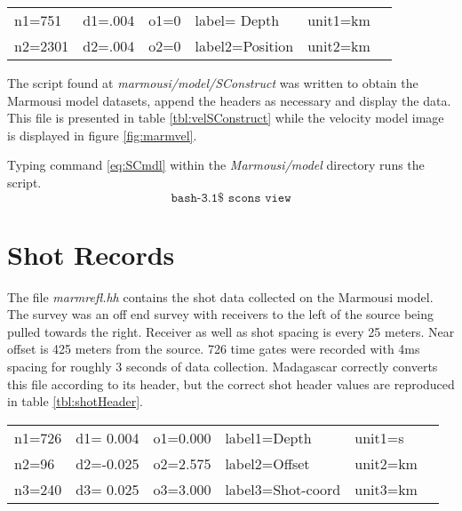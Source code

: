{
\begin{tabular}{|llllll|}
        \hline        
    n1=751    &     d1=.004   &        o1=0  &        label= Depth     & unit1=km &  \\ 
    n2=2301   &     d2=.004   &        o2=0  &        label2=Position  & unit2=km &  \\
	\hline
\end{tabular}
}

The script found at \emph{marmousi/model/SConstruct} was written to obtain the Marmousi model datasets, append the headers as necessary and display the  data.  This file is presented in table \ref{tbl:velSConstruct} while the velocity model image is displayed in figure \ref{fig:marmvel}.
 
{
\tiny

\normalsize
}


Typing command \ref{eq:SCmdl} within the \emph{Marmousi\slash model} directory runs the script.
\begin{equation}\label{eq:SCmdl} \texttt{bash-3.1\$\ scons\ view} \end{equation}


\section{Shot Records}
The file \emph{marmrefl.hh} contains the shot data collected on the Marmousi model.  The survey was an off end survey with receivers to the left of the source being pulled towards the right.  Receiver as well as shot spacing is every 25 meters.  Near offset is 425 meters from the source.  726 time gates were recorded with 4ms spacing for roughly 3 seconds of data collection.  Madagascar correctly converts this file according to its header, but the correct shot header values are reproduced in table \ref{tbl:shotHeader}.   

{
	\begin{tabular}{|llllll|}
	\hline  
	    n1=726 &  d1= 0.004   &  o1=0.000  &  label1=Depth       &   unit1=s   & \\
    	    n2=96  &  d2=-0.025   &  o2=2.575  &  label2=Offset      &   unit2=km  & \\
            n3=240 &  d3= 0.025   &  o3=3.000  &  label3=Shot-coord  &   unit3=km  & \\
	\hline
	\end{tabular}
}

